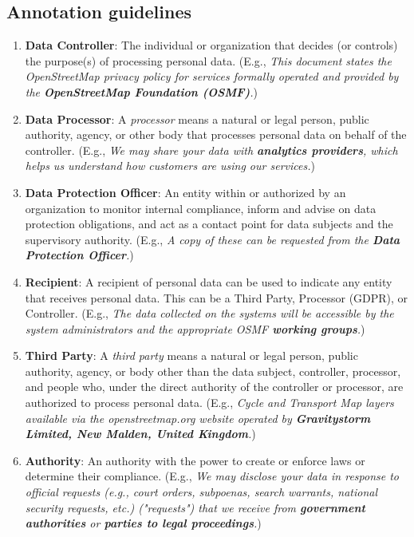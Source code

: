 \documentclass[a4paper,
               biblatex,     %
               hyphens,      %
               ]{jacow}
\begin{document}
\subsection{Annotation guidelines}

\begin{enumerate}
    \item \textbf{Data Controller}: The individual or organization that decides (or controls) the purpose(s) of processing personal data. (E.g., \textit{This document states the OpenStreetMap privacy policy for services formally operated and provided by the \textbf{OpenStreetMap Foundation (OSMF)}.})
    
    \item \textbf{Data Processor}: A \textit{processor} means a natural or legal person, public authority, agency, or other body that processes personal data on behalf of the controller. (E.g., \textit{We may share your data with \textbf{analytics providers}, which helps us understand how customers are using our services.})
    
    \item \textbf{Data Protection Officer}: An entity within or authorized by an organization to monitor internal compliance, inform and advise on data protection obligations, and act as a contact point for data subjects and the supervisory authority. (E.g., \textit{A copy of these can be requested from the \textbf{Data Protection Officer}.})
    
    \item \textbf{Recipient}: A recipient of personal data can be used to indicate any entity that receives personal data. This can be a Third Party, Processor (GDPR), or Controller. (E.g., \textit{The data collected on the systems will be accessible by the system administrators and the appropriate OSMF \textbf{working groups}.})

    \item \textbf{Third Party}: A \textit{third party} means a natural or legal person, public authority, agency, or body other than the data subject, controller, processor, and people who, under the direct authority of the controller or processor, are authorized to process personal data. (E.g., \textit{Cycle and Transport Map layers available via the openstreetmap.org website operated by \textbf{Gravitystorm Limited, New Malden, United Kingdom}.})
    
    \item \textbf{Authority}: An authority with the power to create or enforce laws or determine their compliance. (E.g., \textit{We may disclose your data in response to official requests (e.g., court orders, subpoenas, search warrants, national security requests, etc.) ("requests") that we receive from \textbf{government authorities} or \textbf{parties to legal proceedings}.})
    

\end{enumerate}
\end{document}
